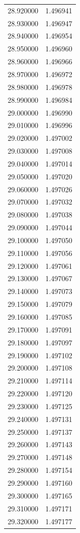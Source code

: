 \begin{tabular}{rr}
28.920000 & 1.496941 \\
28.930000 & 1.496947 \\
28.940000 & 1.496954 \\
28.950000 & 1.496960 \\
28.960000 & 1.496966 \\
28.970000 & 1.496972 \\
28.980000 & 1.496978 \\
28.990000 & 1.496984 \\
29.000000 & 1.496990 \\
29.010000 & 1.496996 \\
29.020000 & 1.497002 \\
29.030000 & 1.497008 \\
29.040000 & 1.497014 \\
29.050000 & 1.497020 \\
29.060000 & 1.497026 \\
29.070000 & 1.497032 \\
29.080000 & 1.497038 \\
29.090000 & 1.497044 \\
29.100000 & 1.497050 \\
29.110000 & 1.497056 \\
29.120000 & 1.497061 \\
29.130000 & 1.497067 \\
29.140000 & 1.497073 \\
29.150000 & 1.497079 \\
29.160000 & 1.497085 \\
29.170000 & 1.497091 \\
29.180000 & 1.497097 \\
29.190000 & 1.497102 \\
29.200000 & 1.497108 \\
29.210000 & 1.497114 \\
29.220000 & 1.497120 \\
29.230000 & 1.497125 \\
29.240000 & 1.497131 \\
29.250000 & 1.497137 \\
29.260000 & 1.497143 \\
29.270000 & 1.497148 \\
29.280000 & 1.497154 \\
29.290000 & 1.497160 \\
29.300000 & 1.497165 \\
29.310000 & 1.497171 \\
29.320000 & 1.497177 \\

\end{tabular}
